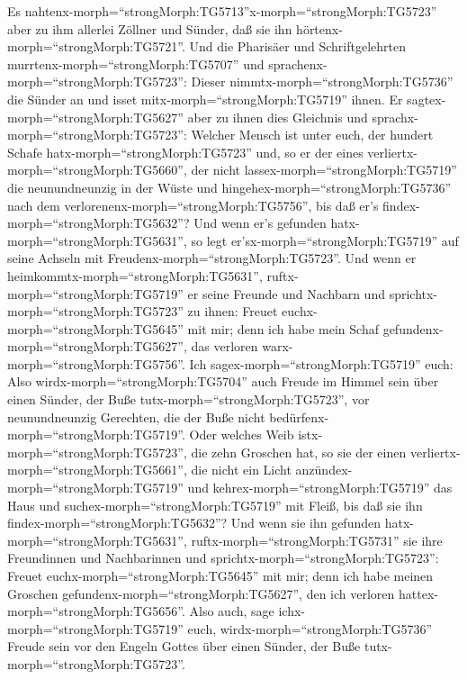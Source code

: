  Es
nahtenx-morph=``strongMorph:TG5713''x-morph=``strongMorph:TG5723'' aber
zu ihm allerlei Zöllner und Sünder, daß sie ihn
hörtenx-morph=``strongMorph:TG5721''.  Und die Pharisäer und
Schriftgelehrten murrtenx-morph=``strongMorph:TG5707'' und
sprachenx-morph=``strongMorph:TG5723'': Dieser
nimmtx-morph=``strongMorph:TG5736'' die Sünder an und isset
mitx-morph=``strongMorph:TG5719'' ihnen.  Er
sagtex-morph=``strongMorph:TG5627'' aber zu ihnen dies Gleichnis und
sprachx-morph=``strongMorph:TG5723'':  Welcher Mensch ist
unter euch, der hundert Schafe hatx-morph=``strongMorph:TG5723'' und, so
er der eines verliertx-morph=``strongMorph:TG5660'', der nicht
lassex-morph=``strongMorph:TG5719'' die neunundneunzig in der Wüste und
hingehex-morph=``strongMorph:TG5736'' nach dem
verlorenenx-morph=``strongMorph:TG5756'', bis daß er's
findex-morph=``strongMorph:TG5632''?  Und wenn er's gefunden
hatx-morph=``strongMorph:TG5631'', so legt
er'sx-morph=``strongMorph:TG5719'' auf seine Achseln mit
Freudenx-morph=``strongMorph:TG5723''.  Und wenn er
heimkommtx-morph=``strongMorph:TG5631'',
ruftx-morph=``strongMorph:TG5719'' er seine Freunde und Nachbarn und
sprichtx-morph=``strongMorph:TG5723'' zu ihnen: Freuet
euchx-morph=``strongMorph:TG5645'' mit mir; denn ich habe mein Schaf
gefundenx-morph=``strongMorph:TG5627'', das verloren
warx-morph=``strongMorph:TG5756''.  Ich
sagex-morph=``strongMorph:TG5719'' euch: Also
wirdx-morph=``strongMorph:TG5704'' auch Freude im Himmel sein über einen
Sünder, der Buße tutx-morph=``strongMorph:TG5723'', vor neunundneunzig
Gerechten, die der Buße nicht bedürfenx-morph=``strongMorph:TG5719''.
 Oder welches Weib istx-morph=``strongMorph:TG5723'', die
zehn Groschen hat, so sie der einen
verliertx-morph=``strongMorph:TG5661'', die nicht ein Licht
anzündex-morph=``strongMorph:TG5719'' und
kehrex-morph=``strongMorph:TG5719'' das Haus und
suchex-morph=``strongMorph:TG5719'' mit Fleiß, bis daß sie ihn
findex-morph=``strongMorph:TG5632''?  Und wenn sie ihn
gefunden hatx-morph=``strongMorph:TG5631'',
ruftx-morph=``strongMorph:TG5731'' sie ihre Freundinnen und Nachbarinnen
und sprichtx-morph=``strongMorph:TG5723'': Freuet
euchx-morph=``strongMorph:TG5645'' mit mir; denn ich habe meinen
Groschen gefundenx-morph=``strongMorph:TG5627'', den ich verloren
hattex-morph=``strongMorph:TG5656''.  Also auch, sage
ichx-morph=``strongMorph:TG5719'' euch,
wirdx-morph=``strongMorph:TG5736'' Freude sein vor den Engeln Gottes
über einen Sünder, der Buße tutx-morph=``strongMorph:TG5723''.
